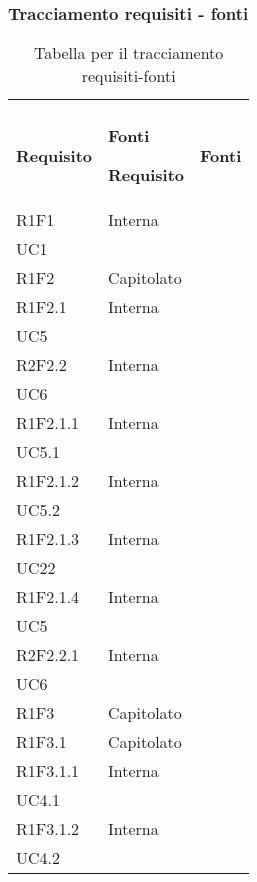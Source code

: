 \newpage
\subsubsection{Tracciamento requisiti - fonti}

\renewcommand{\arraystretch}{2.2}

\begin{longtable}{|C{6.5cm}|C{6.5cm}|}
	\caption{Tabella per il tracciamento requisiti-fonti}\\
	\textbf{Requisito} & \textbf{Fonti}
	\endfirsthead

	\hline

	\textbf{Requisito} & \textbf{Fonti}
	\tabularnewline
	\endhead

	R1F1 & \centering Interna \\ UC1 \tabularnewline

	R1F2 & Capitolato \\

	R1F2.1 & \centering Interna \\ UC5 \tabularnewline

	R2F2.2 & \centering Interna \\ UC6 \tabularnewline


	R1F2.1.1 &   \centering Interna \\ UC5.1 \tabularnewline

	R1F2.1.2 &  \centering Interna \\ UC5.2 \tabularnewline

	R1F2.1.3 &  \centering Interna \\ UC22 \tabularnewline
	
	R1F2.1.4 &   \centering Interna \\ UC5 \tabularnewline

	R2F2.2.1 &  \centering Interna \\ UC6 \tabularnewline

	R1F3 & Capitolato \\

	R1F3.1 & Capitolato \\

	R1F3.1.1 &  \centering Interna \\ UC4.1 \tabularnewline

	R1F3.1.2 &  \centering Interna \\ UC4.2 \tabularnewline


\end{longtable}
